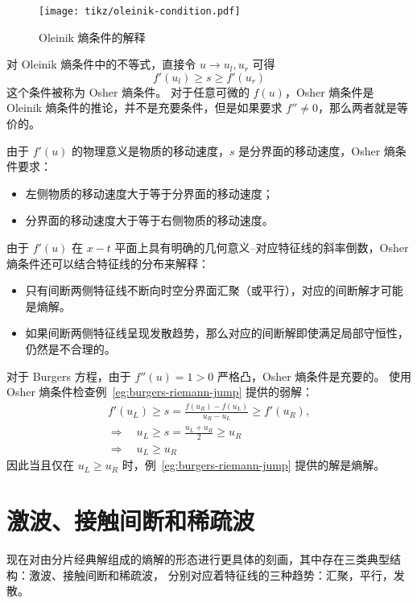 \begin{figure}[htbp]
    \centering
    \texttt{[image: tikz/oleinik-condition.pdf]}
    \caption{Oleinik 熵条件的解释} \label{fig:oleinik-condition}
\end{figure}

对 Oleinik 熵条件中的不等式，直接令 $u \to u_l,u_r$ 可得
\[
    f'(u_l) \ge s \ge f'(u_r)
\]
这个条件被称为 Osher 熵条件。
对于任意可微的 $f(u)$，Osher 熵条件是 Oleinik 熵条件的推论，并不是充要条件，但是如果要求 $f'' \neq 0$，那么两者就是等价的。

由于 $f'(u)$ 的物理意义是物质的移动速度，$s$ 是分界面的移动速度，Osher 熵条件要求：
\begin{itemize}
    \item 左侧物质的移动速度大于等于分界面的移动速度；
    \item 分界面的移动速度大于等于右侧物质的移动速度。
\end{itemize}
由于 $f'(u)$ 在 $x\!-\!t$ 平面上具有明确的几何意义--对应特征线的斜率倒数，Osher 熵条件还可以结合特征线的分布来解释：
\begin{itemize}
    \item 只有间断两侧特征线不断向时空分界面汇聚（或平行），对应的间断解才可能是熵解。
    \item 如果间断两侧特征线呈现发散趋势，那么对应的间断解即使满足局部守恒性，仍然是不合理的。
\end{itemize}


\begin{example}
    对于 Burgers 方程，由于 $f''(u) = 1 >0$ 严格凸，Osher 熵条件是充要的。
    使用 Osher 熵条件检查例~\ref{eg:burgers-riemann-jump} 提供的弱解：
    \begin{gather*}
        f'(u_L) \ge s = \frac{f(u_R)-f(u_L)}{u_R - u_L} \ge f'(u_R), \\
        \Rightarrow \quad u_L \ge s = \frac{u_L + u_R}2 \ge u_R \\
        \Rightarrow \quad u_L \ge u_R
    \end{gather*}
    因此当且仅在 $u_L \ge u_R$ 时，例~\ref{eg:burgers-riemann-jump} 提供的解是熵解。
\end{example}


\section{激波、接触间断和稀疏波}

现在对由分片经典解组成的熵解的形态进行更具体的刻画，其中存在三类典型结构：激波、接触间断和稀疏波，
分别对应着特征线的三种趋势：汇聚，平行，发散。

